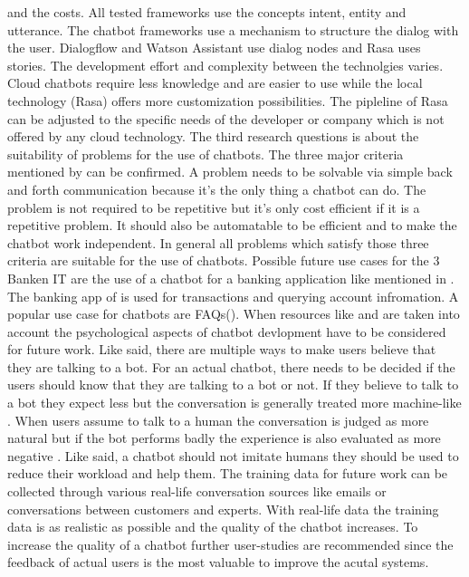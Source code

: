 and the costs.
All tested frameworks use the concepts intent, entity and utterance.
The chatbot frameworks use a mechanism to structure the dialog with the user.
Dialogflow and Watson Assistant use dialog nodes and Rasa uses stories.
The development effort and complexity between the technolgies varies.
Cloud chatbots require less knowledge and are easier to use while the local technology (Rasa) 
offers more customization possibilities.
The pipleline of Rasa can be adjusted to the specific needs of the developer or company which 
is not offered by any cloud technology.
The third research questions is about the suitability of problems for the use of chatbots.
The three major criteria mentioned by \citet{singhbuilding} can be confirmed.
A problem needs to be solvable via simple back and forth communication because it's the 
only thing a chatbot can do.
The problem is not required to be repetitive but it's only cost efficient if it is 
a repetitive problem.
It should also be automatable to be efficient and to make the chatbot work independent.
In general all problems which satisfy those three criteria are suitable for the use of chatbots.
Possible future use cases for the 3 Banken IT are the use of a chatbot for a banking
application like mentioned in \citet{singhbuilding}.
The banking app of \cite{singhbuilding} is used for transactions and querying account infromation.
A popular use case for chatbots are FAQs(\citet{evaluateChatbotsShawar2007, buiildChatbotsPython, huang2007extracting, GO2019304}).
When resources like \citet{} and \citet{} are taken into account the psychological aspects of 
chatbot devlopment have to be considered for future work.
Like \citet{GO2019304} said, there are multiple ways to make users believe that they are talking to a bot.
For an actual chatbot, there needs to be decided if the users should know that they are talking to a bot or not.
If they believe to talk to a bot they expect less but the conversation is generally treated more machine-like \cite{GO2019304}.
When users assume to talk to a human the conversation is judged as more natural but if the bot performs badly the experience is also evaluated as more negative \cite{GO2019304}.
Like \citet{shawar2007chatbots} said, a chatbot should not imitate humans they should be used to reduce their workload and help them.
The training data for future work can be collected through various real-life conversation sources like 
emails or conversations between customers and experts.
With real-life data the training data is as realistic as possible and the quality of the chatbot 
increases.
To increase the quality of a chatbot further user-studies are recommended since the feedback 
of actual users is the most valuable to improve the acutal systems.
